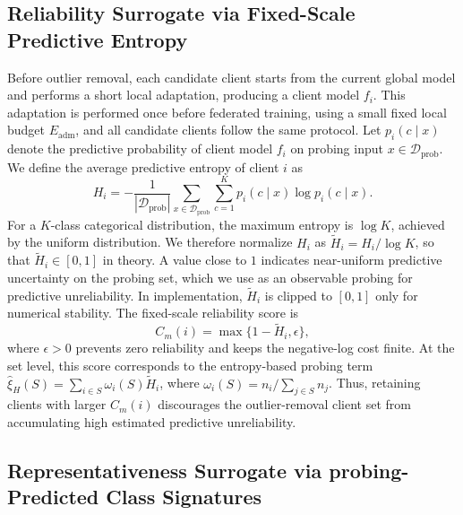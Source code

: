 ﻿\documentclass[conference]{IEEEtran}
\theoremstyle{definition}
\theoremstyle{remark}
\begin{document}
\subsection{Reliability Surrogate via Fixed-Scale Predictive Entropy}
\label{subsec:reliability_surrogate}

Before outlier removal, each candidate client starts from the current global model and performs a short local adaptation, producing a client model $f_i$.
This adaptation is performed once before federated training, using a small fixed local budget $E_{\mathrm{adm}}$, and all candidate clients follow the same protocol.
Let $p_i(c\mid x)$ denote the predictive probability of client model $f_i$ on probing input $x\in\mathcal D_{\mathrm{prob}}$.
We define the average predictive entropy of client $i$ as
\begin{equation}
\label{eq:entropy_main}
H_i
=
-\frac{1}{|\mathcal D_{\mathrm{prob}}|}
\sum_{x\in\mathcal D_{\mathrm{prob}}}
\sum_{c=1}^{K}
p_i(c\mid x)\log p_i(c\mid x).
\end{equation}
For a $K$-class categorical distribution, the maximum entropy is $\log K$, achieved by the uniform distribution.
We therefore normalize $H_i$ as $\widetilde H_i=H_i/\log K$, so that $\widetilde H_i\in[0,1]$ in theory.
A value close to $1$ indicates near-uniform predictive uncertainty on the probing set, which we use as an observable probing for predictive unreliability.
In implementation, $\widetilde H_i$ is clipped to $[0,1]$ only for numerical stability.
The fixed-scale reliability score is
\begin{equation}
\label{eq:quality_score}
C_m(i)
=
\max\{1-\widetilde H_i,\epsilon\},
\end{equation}
where $\epsilon>0$ prevents zero reliability and keeps the negative-log cost finite.
At the set level, this score corresponds to the entropy-based probing term $\widehat{\xi}_{H}(S)=\sum_{i\in S}\omega_i(S)\widetilde H_i$, where $\omega_i(S)=n_i/\sum_{j\in S}n_j$.
Thus, retaining clients with larger $C_m(i)$ discourages the outlier-removal client set from accumulating high estimated predictive unreliability.

\subsection{Representativeness Surrogate via probing-Predicted Class Signatures}
\label{subsec:representativeness_surrogate}
\end{document}
